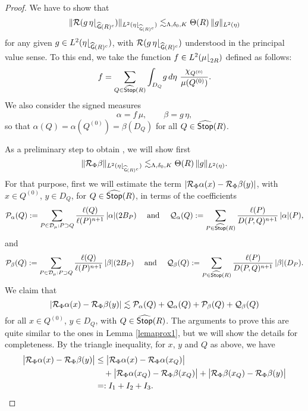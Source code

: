 \begin{proof}
We have to show that
\begin{equation}\label{eqbeta8430}
\|{\mathcal R} (g\,\eta{\lfloor}_{{\widehat{{\mathsf{G}}}}(R)^c})\|_{L^2(\eta{\lfloor}_{{\widehat{{\mathsf{G}}}}(R)^c})} \lesssim_{\Lambda,\delta_0,K}\Theta(R)\, \|g\|_{L^2(\eta)}
\end{equation}
for any given $g\in L^2(\eta{\lfloor}_{{\widehat{{\mathsf{G}}}}(R)^c})$, with ${\mathcal R} (g\,\eta{\lfloor}_{{\widehat{{\mathsf{G}}}}(R)^c})$ 
understood in the principal value sense. To this end, we take
the function $f\in L^2(\mu{\lfloor}_{2R})$ defined as follows:
\begin{equation}\label{deff99}
f = \sum_{Q\in{\widehat{{\mathsf {Stop}}}}(R)} \int_{D_Q}\! g\,d\eta \,\,\frac{\chi_{Q^{(0)}}}{\mu(Q^{(0)})}.
\end{equation}
We also consider the signed measures
$$\alpha = f\,\mu,\qquad \beta = g\,\eta,$$
so that $\alpha(Q) = \alpha(Q^{(0)}) = \beta(D_Q)$ for all $Q\in{\widehat{{\mathsf {Stop}}}}(R)$.

As a preliminary step to obtain , we will show first 
\begin{equation}\label{eqbeta843}
\|{\mathcal R}_\Phi \beta\|_{L^2(\eta{\lfloor}_{{\widehat{{\mathsf{G}}}}(R)^c})} \lesssim_{\Lambda,\delta_0,K}\Theta(R)\, \|g\|_{L^2(\eta)}.
\end{equation}
For that purpose, first we will estimate the term  $|{\mathcal R}_\Phi \alpha(x) -{\mathcal R}_\Phi\beta(y)|$,
with $x\in Q^{(0)}$, $y\in D_Q$, for $Q\in{\widehat{{\mathsf {Stop}}}}(R)$, in terms of the coefficients
$${\mathcal P}_\alpha(Q) := \sum_{P\in{\mathcal D}_\mu:P\supset Q} \frac{\ell(Q)}{\ell(P)^{n+1}} \,|\alpha|(2B_P)
\quad \mbox{ and }\quad
{\mathcal Q}_\alpha(Q) := \sum_{P\in{\widehat{{\mathsf {Stop}}}}(R)} \frac{\ell(P)}{D(P,Q)^{n+1}}\,|\alpha|(P),
$$
and
$${\mathcal P}_\beta(Q) := \sum_{P\in{\mathcal D}_\mu:P\supset Q} \frac{\ell(Q)}{\ell(P)^{n+1}} \,|\beta|(2B_P)
\quad \mbox{ and }\quad
{\mathcal Q}_\beta(Q) := \sum_{P\in{\widehat{{\mathsf {Stop}}}}(R)} \frac{\ell(P)}{D(P,Q)^{n+1}}\,|\beta|(D_P).
$$
We claim that
\begin{equation}\label{eqclaim7284}
|{\mathcal R}_\Phi \alpha(x) -{\mathcal R}_\Phi\beta(y)| \lesssim {\mathcal P}_\alpha(Q) + {\mathcal Q}_\alpha(Q)+{\mathcal P}_\beta(Q) + {\mathcal Q}_\beta(Q)
\end{equation}
for all $x\in Q^{(0)}$, $y\in D_Q$, with $Q\in{\widehat{{\mathsf {Stop}}}}(R)$.
The arguments to prove this are quite similar to the ones in Lemma \ref{lemaprox1}, but we 
will show the details for completeness.
By the triangle inequality, for $x$, $y$ and $Q$ as above, we have
\begin{align*}
\big|{\mathcal R}_\Phi \alpha(x) - {\mathcal R}_\Phi \beta(y)\big| & \leq 
\big|{\mathcal R}_\Phi \alpha(x) - {\mathcal R}_\Phi \alpha(x_Q)\big|\\
&\quad + 
\big|{\mathcal R}_\Phi \alpha(x_Q) - {\mathcal R}_\Phi \beta(x_Q)\big| 
+ \big|{\mathcal R}_\Phi \beta(x_Q) - {\mathcal R}_\Phi \beta(y)\big| \\
& =: I_1 + I_2 + I_3.
\end{align*}


\end{proof}
